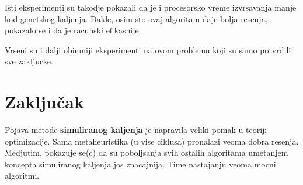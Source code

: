 \documentclass[a4paper]{article}
\begin{document}
Isti eksperimenti su takodje pokazali da je i procesorsko vreme izvrsavanja manje kod genetskog kaljenja. Dakle, osim sto ovaj algoritam daje bolja resenja, pokazalo se i da je racunski efikasnije. \par Vrseni su i dalji obimniji eksperimenti na ovom problemu koji su samo potvrdili sve zakljucke.


\section{Zaključak}
\label{sec:zakljucak}

Pojava metode \textbf{simuliranog kaljenja} je napravila veliki pomak u teoriji optimizacije. Sama metaheuristika (u vise ciklusa) pronalazi veoma dobra resenja. Medjutim, pokazuje se(c) da su poboljsanja svih ostalih algoritama umetanjem koncepta simuliranog kaljenja jos znacajnija. Time nastajanju veoma mocni algoritmi.


\newpage
{}

\appendix



\nocite{*}
\end{document}
